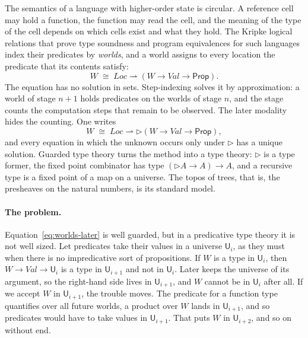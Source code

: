 \documentclass[acmsmall,nonacm,screen]{acmart}
\newcommand{\later}{{\triangleright}}
\newcommand{\Uv}{\mathsf{U}}
\newcommand{\kw}[1]{\mathsf{#1}}
\newcommand{\Loc}{\mathit{Loc}}
\newcommand{\Val}{\mathit{Val}}
\newcommand{\Wld}{W}
\newcommand{\fmap}{\rightharpoonup}
\begin{document}
The semantics of a language with higher-order state is circular. A reference cell may hold
a function, the function may read the cell, and the meaning of the type of the cell
depends on which cells exist and what they hold. The Kripke logical relations that prove
type soundness and program equivalences for such languages index their predicates by
\emph{worlds}, and a world assigns to every location the predicate that its contents
satisfy:
\begin{equation}\label{eq:worlds}
  \Wld \;\cong\; \Loc \fmap (\Wld \to \Val \to \kw{Prop}).
\end{equation}
The equation has no solution in sets. Step-indexing \citep{AppelMcAllester2001,Ahmed2004}
solves it by approximation: a world of stage $n+1$ holds predicates on the worlds of stage
$n$, and the stage counts the computation steps that remain to be observed. The later
modality \citep{Nakano2000,AMRV2007,DAB2011} hides the counting. One writes
\begin{equation}\label{eq:worlds-later}
  \Wld \;\cong\; \Loc \fmap \later(\Wld \to \Val \to \kw{Prop}),
\end{equation}
and every equation in which the unknown occurs only under $\later$ has a unique solution.
Guarded type theory \citep{BMSS2012,BM2013,gDTT2016} turns the method into a type theory:
$\later$ is a type former, the fixed point combinator has type $(\later A \to A) \to A$, and
a recursive type is a fixed point of a map on a universe. The topos of trees, that is, the
presheaves on the natural numbers, is its standard model.

\paragraph{The problem.}
Equation~\eqref{eq:worlds-later} is well guarded, but in a predicative type theory it is not
well sized. Let predicates take their values in a universe $\Uv_i$, as they must when there
is no impredicative sort of propositions. If $\Wld$ is a type in $\Uv_i$, then
$\Wld \to \Val \to \Uv_i$ is a type in $\Uv_{i+1}$ and not in $\Uv_i$. Later keeps the
universe of its argument, so the right-hand side lives in $\Uv_{i+1}$, and $\Wld$ cannot be
in $\Uv_i$ after all. If we accept $\Wld$ in $\Uv_{i+1}$, the trouble moves. The predicate
for a function type quantifies over all future worlds, a product over $\Wld$ lands in
$\Uv_{i+1}$, and so predicates would have to take values in $\Uv_{i+1}$. That puts $\Wld$ in
$\Uv_{i+2}$, and so on without end.
\end{document}
